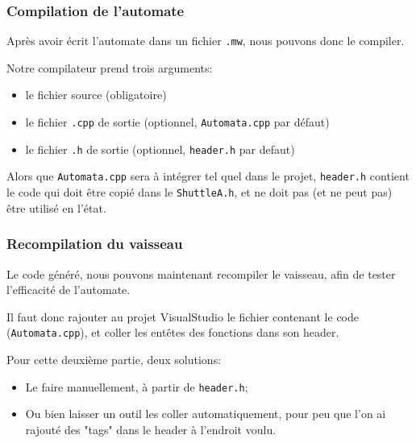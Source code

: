 \documentclass[a4paper,11pt]{article}
\begin{document}
        \subsubsection{Compilation de l'automate}
            Après avoir écrit l'automate dans un fichier \texttt{.mw}, nous pouvons donc le compiler.
            
            Notre compilateur prend trois arguments:
            \begin{itemize}
                \item le fichier source (obligatoire)
                \item le fichier \verb|.cpp| de sortie (optionnel, \texttt{Automata.cpp} par défaut)
                \item le fichier \verb|.h| de sortie (optionnel, \texttt{header.h} par defaut)
            \end{itemize}
            
            Alors que \texttt{Automata.cpp} sera à intégrer tel quel dans le projet, \texttt{header.h} contient le code qui doit être copié dans le \texttt{ShuttleA.h}, et ne doit pas (et ne peut pas) être utilisé en l'état.

        \subsubsection{Recompilation du vaisseau}
            Le code généré, nous pouvons maintenant recompiler le vaisseau, afin de tester l'efficacité de l'automate.
            
            Il faut donc rajouter au projet VisualStudio le fichier contenant le code (\texttt{Automata.cpp}), et coller les entêtes des fonctions dans son header.
            
            Pour cette deuxième partie, deux solutions:
            \begin{itemize}
                \item Le faire manuellement, à partir de \texttt{header.h};
                \item Ou bien laisser un outil les coller automatiquement, pour peu que l'on ai rajouté des "tags" dans le header à l'endroit voulu. 
            \end{itemize}
            
\end{document}
